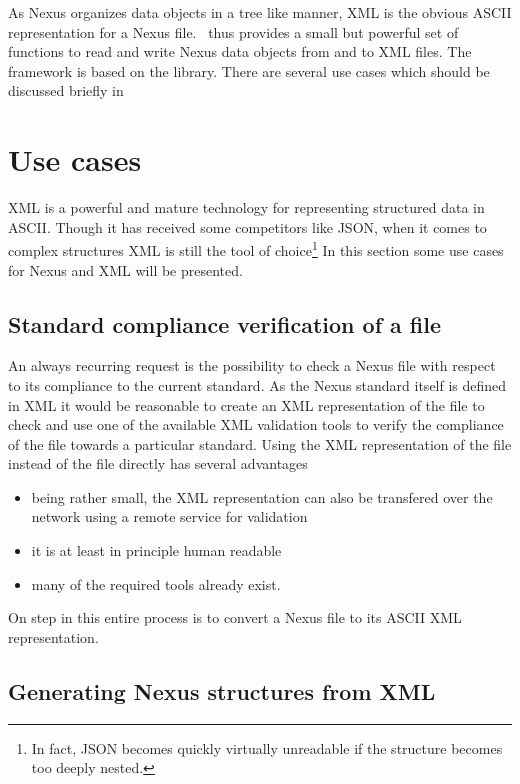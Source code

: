 
As Nexus organizes data objects in a tree like manner, XML is the obvious ASCII
representation for a Nexus file.
\libpniio\ thus provides a small but powerful set of functions to read and write 
Nexus data objects from and to XML files. The framework is based on the 
 library. 
There are several use cases which should be discussed briefly in 

\section{Use cases}\label{sec:xml:usecases}

XML is a powerful and mature technology for representing structured data in 
ASCII. Though it has received some competitors like JSON, when it comes to 
complex structures XML is still the tool of choice\footnote{In fact, JSON
becomes quickly virtually unreadable if the structure becomes too deeply
nested.}
In this section some use cases for Nexus and XML will be presented. 

\subsection{Standard compliance verification of a file}

An always recurring request is the possibility to check a Nexus file with
respect to its compliance to the current standard. As the Nexus standard 
itself is defined in XML it would be reasonable to create an XML representation
of the file to check and use one of the available XML validation tools to 
verify the compliance of the file towards a particular standard. 
Using the XML representation of the file instead of the file directly has 
several advantages 
\begin{itemize}
\item being rather small, the XML representation can also be transfered 
over the network using a remote service for validation
\item it is at least in principle human readable 
\item many of the required tools already exist. 
\end{itemize}
On step in this entire process is to convert a Nexus file to its ASCII XML 
representation.

\subsection{Generating Nexus structures from XML}

